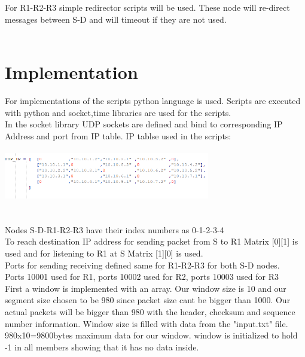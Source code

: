 \documentclass[conference]{IEEEtran}
\begin{document}
For R1-R2-R3 simple redirector scripts will be used. These node will re-direct messages between S-D and will timeout if they are not used.\\ \qquad \\

 

\section{Implementation}

For implementations of the scripts python language is used. Scripts are executed with python and socket,time libraries are used for the scripts.\\

In the socket library UDP sockets are defined and bind to corresponding IP Address and port from IP table. IP tablse used in the scripts:\\

\includegraphics[width = 90mm, height = 30mm]{iptable.png}\\ \qquad \\

Nodes S-D-R1-R2-R3 have their index numbers as 0-1-2-3-4\\

To reach destination IP address for sending packet from S to R1  Matrix [0][1] is used and for listening to R1 at S Matrix [1][0] is used.\\

Ports for sending receiving defined same for R1-R2-R3 for both S-D nodes.\\

Ports 10001 used for R1, ports 10002 used for R2, ports 10003 used for R3\\

First a window is implemented with an array. Our window size is 10 and our segment size chosen to be 980 since packet size cant be bigger than 1000. Our actual packets will be bigger than 980 with the header, checksum and sequence number information. Window size is filled with data from the "input.txt" file. 980x10=9800bytes maximum data for our window. window is initialized to hold -1 in all members showing that it has no data inside.\\
\end{document}
